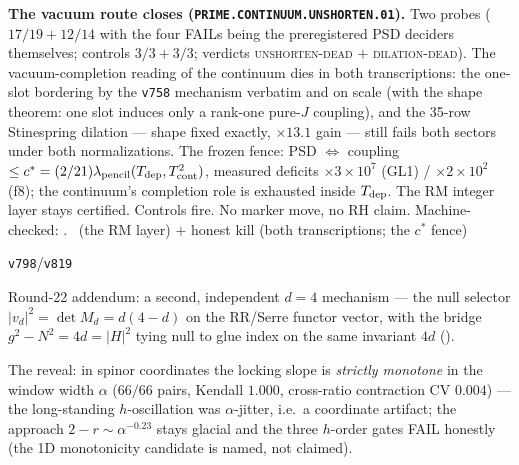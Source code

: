 \par\smallskip\noindent\textbf{The vacuum route closes
(\texttt{PRIME.CONTINUUM.UNSHORTEN.01}).}
Two probes ($17/19+12/14$ with the four FAILs being the
preregistered PSD deciders themselves; controls $3/3+3/3$;
verdicts \textsc{unshorten-dead} $+$ \textsc{dilation-dead}).  The
vacuum-completion reading of the continuum dies in both
transcriptions: the one-slot bordering by the \texttt{v758}
mechanism verbatim and on scale (with the shape theorem: one slot
induces only a rank-one pure-$J$ coupling), and the 35-row
Stinespring dilation --- shape fixed exactly, $\times13.1$ gain
--- still fails both sectors under both normalizations.  The
frozen fence: PSD $\iff$ coupling $\le
c^*=(2/21)\lambda_{\rm pencil}(T_{\rm dep},T_{\rm cont}^2)$,
measured deficits $\times3\times10^7$ (GL1) /
$\times2\times10^2$ (f8); the continuum's completion role is
exhausted inside $T_{\rm dep}$.  The RM integer layer stays
certified.  Controls fire.  No marker move, no RH claim.
Machine-checked: .
\mE\ (the RM layer) $+$ honest kill (both transcriptions; the
$c^*$ fence)
\par\smallskip


\texttt{v798}/\texttt{v819}

Round-22 addendum: a second, independent $d=4$ mechanism ---
the null selector $|v_d|^2=\det M_d=d(4-d)$ on the RR/Serre
functor vector, with the bridge $g^2-N^2=4d=|H|^2$ tying null to
glue index on the same invariant $4d$
().


The reveal: in spinor coordinates the
locking slope is \emph{strictly monotone} in the window width
$\alpha$ ($66/66$ pairs, Kendall $1.000$, cross-ratio contraction
CV $0.004$) --- the long-standing $h$-oscillation was $\alpha$-jitter,
i.e.\ a coordinate artifact; the approach $2-r\sim\alpha^{-0.23}$
stays glacial and the three $h$-order gates FAIL honestly (the 1D
monotonicity candidate is named, not claimed).  

